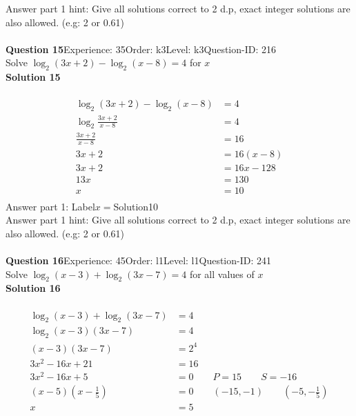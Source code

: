 \documentclass{article}
\begin{document}
Answer part 1 hint: \hspace{15pt}Give all solutions correct to 2 d.p, exact integer solutions are also allowed. (e.g: 2 or 0.61)\\
\\[4pt]
\noindent\textbf{Question 15}\hspace{20pt}Experience: 35\hspace{20pt}Order: k3\hspace{20pt}Level: k3\hspace{20pt}Question-ID: 216\\[2pt]
Solve $\log_{2}(3x+2)-\log_{2}(x-8)=4$ for $x$\\[4pt]
\noindent\textbf{Solution 15}\\[2pt]
\\[-35pt]\begin{align*}
\log_{2}(3x+2)-\log_{2}(x-8)&=4\\[2pt]
\log_{2}\displaystyle\frac{3x+2}{x-8}&=4\\[2pt]
\displaystyle\frac{3x+2}{x-8}&=16\\[2pt]
3x+2&=16(x-8)\\[2pt]
3x+2&=16x-128\\[2pt]
13x&=130\\[2pt]
x&=10\\[-50pt]
\end{align*}
Answer part 1: \hspace{10pt}Label\hspace{10pt}$x=$\hspace{10pt}Solution\hspace{10pt}10\\
Answer part 1 hint: \hspace{15pt}Give all solutions correct to 2 d.p, exact integer solutions are also allowed. (e.g: 2 or 0.61)\\
\\[4pt]
\noindent\textbf{Question 16}\hspace{20pt}Experience: 45\hspace{20pt}Order: l1\hspace{20pt}Level: l1\hspace{20pt}Question-ID: 241\\[2pt]
Solve $\log_{2}(x-3)+\log_{2}(3x-7)=4$ for all values of $x$\\[4pt]
\noindent\textbf{Solution 16}\\[2pt]
\\[-35pt]\begin{align*}
\log_{2}(x-3)+\log_{2}(3x-7)&=4\\[2pt]
\log_{2}(x-3)(3x-7)&=4\\[2pt]
(x-3)(3x-7)&=2^4\\[2pt]
3x^2-16x+21&=16\\[2pt]
3x^2-16x+5&=0\qquad P=15 \qquad S=-16\\[2pt]
(x-5)\left(x-\displaystyle\frac{1}{5}\right)&=0\qquad (-15,-1) \qquad \left(-5,-\displaystyle\frac{1}{5}\right)\\[2pt]
x&=5
\end{align*}
\end{document}
